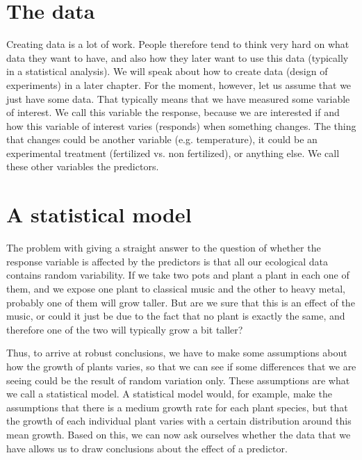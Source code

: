\documentclass{tufte-book} %
\begin{document}
\section{The data}

Creating data is a lot of work. People therefore tend to think very hard on what data they want to have, and also how they later want to use this data (typically in a statistical analysis). We will speak about how to create data (design of experiments) in a later chapter. For the moment, however, let us assume that we just have some data. That typically means that we have measured some variable of interest. We call this variable the response, because we are interested if and how this variable of interest varies (responds) when something changes. The thing that changes could be another variable (e.g. temperature), it could be an experimental treatment (fertilized vs. non fertilized), or anything else. We call these other variables the predictors. 

\section{A statistical model}

The problem with giving a straight answer to the question of whether the response variable is affected by the predictors is that all our ecological data contains random variability. If we take two pots and plant a plant in each one of them, and we expose one plant to classical music and the other to heavy metal, probably one of them will grow taller. But are we sure that this is an effect of the music, or could it just be due to the fact that no plant is exactly the same, and therefore one of the two will typically grow a bit taller?

Thus, to arrive at robust conclusions, we have to make some assumptions about how the growth of plants varies, so that we can see if some differences that we are seeing could be the result of random variation only. These assumptions are what we call a statistical model. A statistical model would, for example, make the assumptions that there is a medium growth rate for each plant species, but that the growth of each individual plant varies with a certain distribution around this mean growth. Based on this, we can now ask ourselves whether the data that we have allows us to draw conclusions about the effect of a predictor. 
\end{document}
